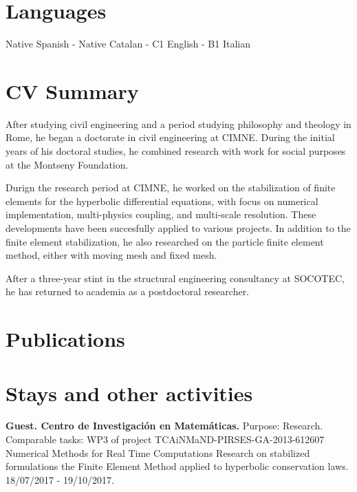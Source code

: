 \documentclass[12pt]{article}
\begin{document}
\section{Languages}
Native Spanish - Native Catalan - C1 English - B1 Italian


\section{CV Summary}
After studying civil engineering and a period studying philosophy and theology in Rome, he began
a doctorate in civil engineering at CIMNE. During the initial years of his doctoral studies, he combined
research with work for social purposes at the Montseny Foundation.

Durign the research period at CIMNE, he worked on the stabilization of finite elements for the hyperbolic
differential equations, with focus on numerical implementation, multi-physics coupling, and multi-scale
resolution. These developments have been succesfully applied to various projects. In addition to
the finite element stabilization, he also researched on the particle finite element method, either
with moving mesh and fixed mesh.

After a three-year stint in the structural engineering consultancy at SOCOTEC, he has returned
to academia as a postdoctoral researcher.


\section{Publications}
\nocite{*}
\printbibliography[heading={subbibliography}, title={Journal papers}, type=article]
\printbibliography[heading={subbibliography}, title={Theses}, type=thesis]
\printbibliography[heading={subbibliography}, title={Conferences}, type=inproceedings]


\section{Stays and other activities}
\textbf{Guest. Centro de Investigación en Matemáticas.} Purpose: Research. Comparable tasks: WP3 of project
TCAiNMaND-PIRSES-GA-2013-612607 Numerical Methods for Real Time Computations Research on stabilized
formulations the Finite Element Method applied to hyperbolic conservation laws. 18/07/2017 - 19/10/2017.
\end{document}
